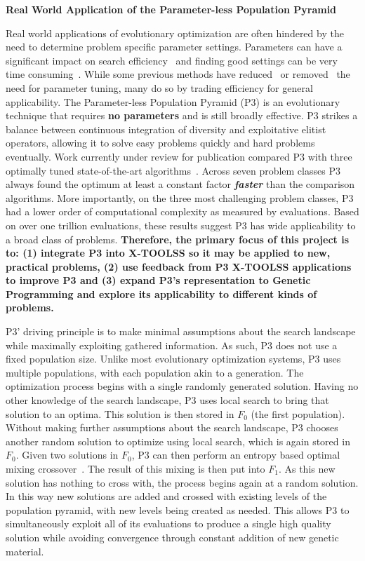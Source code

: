 \documentclass{article}
\begin{document}
\begin{center}
\textbf{Real World Application of the Parameter-less Population Pyramid}
\end{center}

Real world applications of evolutionary optimization are often
hindered by the need to determine problem specific parameter
settings.  
Parameters can have a significant impact on search efficiency~\cite{goldberg:1991:gasize}
and finding good settings can be very time consuming~\cite{grefenstette:1986:optimalga}.
While some previous methods have reduced~\cite{Back:1992:selfadapt}
or removed~\cite{pelikan:2004:parameterlesshboa} the
need for parameter tuning, many do so by trading efficiency for
general applicability.  The Parameter-less Population Pyramid (P3)
is an evolutionary technique that requires \textbf{no parameters}
and is still broadly effective. P3 strikes a balance between
continuous integration of diversity and exploitative elitist
operators, allowing it to solve easy problems quickly and hard
problems eventually.  Work currently under review for publication
compared P3 with three optimally tuned state-of-the-art algorithms~\cite{thierens:2013:ltgahiff,doerr:2013:lambdalambda}.
Across seven problem classes P3 always found the
optimum at least a constant factor \emph{\textbf{faster}} than the
comparison algorithms.
More importantly, on the three most challenging problem classes,
P3 had a lower order of computational complexity as measured by
evaluations.  Based on over one trillion evaluations, these results
suggest P3 has wide applicability to a broad class of
problems.  \textbf{Therefore, the primary focus of this project is to:
(1) integrate P3 into X-TOOLSS so it may be applied to
new, practical problems, (2) use feedback from P3 X-TOOLSS applications
to improve P3 and (3) expand
P3's representation to Genetic Programming and explore its
applicability to different kinds of problems.}

P3' driving principle is to make
minimal assumptions about the search landscape while maximally
exploiting gathered information.  As such, P3 does not use a fixed
population size.  Unlike most evolutionary optimization systems, P3 uses multiple
populations, with each population akin to a generation. 
The optimization process begins with a single randomly generated solution.
Having no other knowledge of the search landscape, P3 uses local search
to bring that solution to an optima.  This solution is then stored in $F_0$
(the first population).  Without making further assumptions
about the search landscape, P3 chooses another random solution to optimize using
local search, which is again stored in $F_0$.  Given two solutions in $F_0$, P3 can then
perform an entropy based optimal mixing crossover~\cite{bosman:2011:lsbbo}.  The
result of this mixing is then put into $F_1$.  As this new solution has nothing
to cross with, the process begins again at a random solution.  In this way new
solutions are added and crossed with existing levels of the population pyramid,
with new levels being created as needed.  This allows P3 to simultaneously exploit
all of its evaluations to produce a single high quality solution while avoiding convergence through
constant addition of new genetic material.
\end{document}
